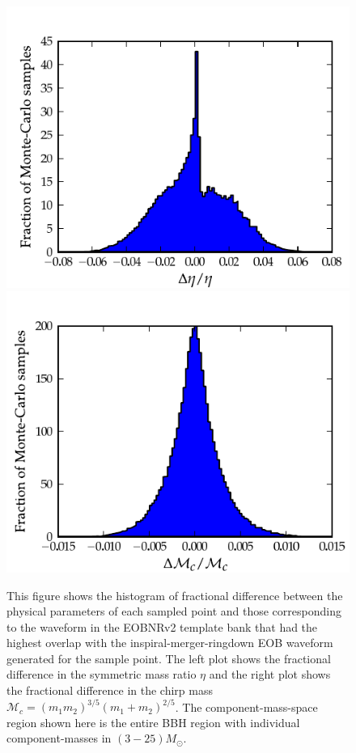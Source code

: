 \documentclass[aps,
prd,
amsmath,
amssymb,
twocolumn,
floatfix,
groupedaddress]{revtex4-1}
\begin{document}
\begin{figure}[]
\centerline{
\includegraphics[scale=0.04, clip=false,keepaspectratio=true, width=\columnwidth]{hist_eta_errparamEOBHMEOB22.pdf}\label{fig:errparams_eob22eobhm_eta}              
\includegraphics[scale=0.04, clip=false, keepaspectratio=true, width=\columnwidth]{hist_mchirp_errparamEOBHMEOB22.pdf}\label{fig:errparams_eob22eobhm_mchirp}
}
\caption{This figure shows the histogram of fractional difference between the physical parameters of each sampled point and those corresponding to the waveform in the EOBNRv2 template bank that had the highest overlap with the inspiral-merger-ringdown EOB waveform generated for the sample point. The left plot shows the fractional difference in the symmetric mass ratio $\eta$ and the right plot shows the fractional difference in the chirp mass $\mathcal{M}_c= (m_1m_2)^{3/5}(m_1+m_2)^{2/5}$. The component-mass-space region shown here is the entire BBH region with individual component-masses in $(3-25)M_{\odot}$.}
\label{fig:errparams_eob22eobhm}
\end{figure}
\end{document}
